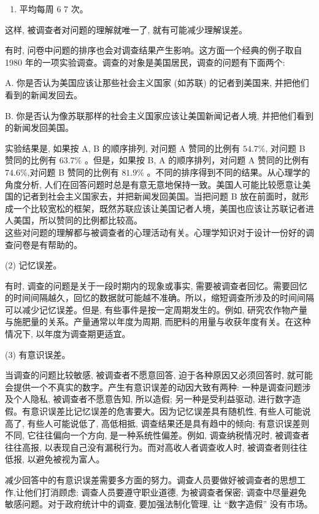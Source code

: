 \documentclass[10pt]{article}
\begin{document}
\begin{CJK*}{UTF8}{bsmi}
\begin{enumerate}
  \item 平均每周 6 7 次。

\end{enumerate}

这样, 被调查者对问题的理解就唯一了, 就有可能减少理解误差。

有时, 问卷中问题的排序也会对调查结果产生影响。这方面一个经典的例子取自 1980 年的一项实验调查。调查的对象是美国居民，调查的问题有下面两个:

A. 你是否认为美国应该让那些社会主义国家 (如苏联) 的记者到美国来, 并把他们看到的新闻发回去。

B. 你是否认为像苏联那样的社会主义国家应该让美国新闻记者人境, 并把他们看到的新闻发回美国。

实验结果是, 如果按 A, B 的顺序排列, 对问题 A 赞同的比例有 $54.7 \%$, 对问题 B 赞同的比例有 $63.7 \%$ 。但是，如果按 B, A 的顺序排列，对问题 A 赞同的比例有 $74.6 \%$,对问题 B 赞同的比例有 $81.9 \%$ 。不同的排序得到不同的结果。从心理学的角度分析, 人们在回答问题时总是有意无意地保持一致。美国人可能比较愿意让美国的记者到社会主义国家去，并把新闻发回美国。当把问题 B 放在前面时，就形成一个比较宽松的框架，既然苏联应该让美国记者人境，美国也应该让苏联记者进人美国，所以赞同的比例都比较高。\\
这些对问题的理解都与被调查者的心理活动有关。心理学知识对于设计一份好的调查问卷是有帮助的。

(2) 记忆误差。

有时, 调查的问题是关于一段时期内的现象或事实, 需要被调查者回忆。需要回忆的时间间隔越久，回忆的数据就可能越不准确。所以，缩短调查所涉及的时间间隔可以减少记忆误差。但是, 有些事件是按一定周期发生的。例如, 研究农作物产量与施肥量的关系。产量通常以年度为周期, 而肥料的用量与收获年度有关。在这种情况下, 以年度为调查期更适宜。

(3) 有意识误差。

当调查的问题比较敏感, 被调查者不愿意回答, 迫于各种原因又必须回答时, 就可能会提供一个不真实的数字。产生有意识误差的动因大致有两种: 一种是调查问题涉及个人隐私, 被调查者不愿意告知, 所以造假; 另一种是受利益驱动, 进行数字造假。有意识误差比记忆误差的危害要大。因为记忆误差具有随机性, 有些人可能说高了, 有些人可能说低了, 高低相抵, 调查结果还是具有趋中的倾向; 有意识误差则不同, 它往往偏向一个方向, 是一种系统性偏差。例如, 调查纳税情况时, 被调查者往往高报, 以表现自己没有漏税行为。而对高收人者调查收人时, 被调查者则往往低报, 以避免被视为富人。

减少回答中的有意识误差需要多方面的努力。调查人员要做好被调查者的思想工作,让他们打消顾虑; 调查人员要遵守职业道德, 为被调查者保密; 调查中尽量避免敏感问题。对于政府统计中的调查, 要加强法制化管理, 让 “数字造假” 没有市场。


\end{CJK*}
\end{document}
